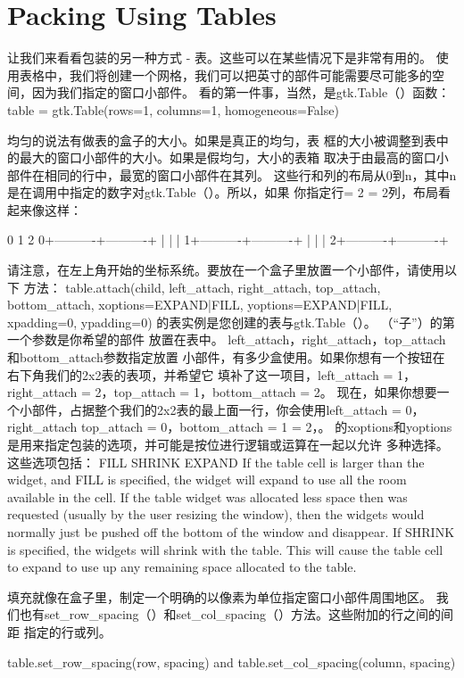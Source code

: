 \section{Packing Using Tables}
让我们来看看包装的另一种方式 - 表。这些可以在某些情况下是非常有用的。
使用表格中，我们将创建一个网格，我们可以把英寸的部件可能需要尽可能多的空间，因为我们指定的窗口小部件。
看的第一件事，当然，是gtk.Table（）函数：
table = gtk.Table(rows=1, columns=1, homogeneous=False)

均匀的说法有做表的盒子的大小。如果是真正的均匀，表
框的大小被调整到表中的最大的窗口小部件的大小。如果是假均匀，大小的表箱
取决于由最高的窗口小部件在相同的行中，最宽的窗口小部件在其列。
这些行和列的布局从0到n，其中n是在调用中指定的数字对gtk.Table（）。所以，如果
你指定行= 2 = 2列，布局看起来像这样：

0	1	2
0+----------+----------+
|
|
|
1+----------+----------+
|
|
|
2+----------+----------+


请注意，在左上角开始的坐标系统。要放在一个盒子里放置一个小部件，请使用以下
方法：
table.attach(child, left_attach, right_attach, top_attach, bottom_attach, xoptions=EXPAND|FILL, yoptions=EXPAND|FILL, xpadding=0, ypadding=0)
的表实例是您创建的表与gtk.Table（）。 （“子”）的第一个参数是你希望的部件
放置在表中。
left_attach，right_attach，top_attach和bottom_attach参数指定放置
小部件，有多少盒使用。如果你想有一个按钮在右下角我们的2x2表的表项，并希望它
填补了这一项目，left_attach = 1，right_attach = 2，top_attach = 1，bottom_attach
= 2。
现在，如果你想要一个小部件，占据整个我们的2x2表的最上面一行，你会使用left_attach = 0，
right_attach top_attach = 0，bottom_attach = 1 = 2，。
的xoptions和yoptions是用来指定包装的选项，并可能是按位进行逻辑或运算在一起以允许
多种选择。
这些选项包括：
FILL
SHRINK
EXPAND
If the table cell is larger than the widget, and FILL is specified, the widget will expand to
use all the room available in the cell.
If the table widget was allocated less space then was requested (usually by the user resizing
the window), then the widgets would normally just be pushed off the bottom of the window
and disappear. If SHRINK is specified, the widgets will shrink with the table.
This will cause the table cell to expand to use up any remaining space allocated to the table.


填充就像在盒子里，制定一个明确的以像素为单位指定窗口小部件周围地区。
我们也有set_row_spacing（）和set_col_spacing（）方法。这些附加的行之间的间距
指定的行或列。

table.set_row_spacing(row, spacing)
and
table.set_col_spacing(column, spacing)

